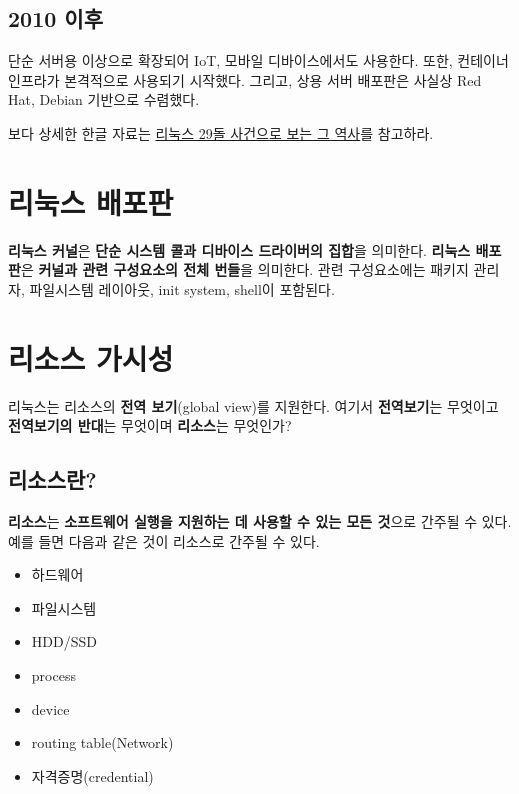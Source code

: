 \subsection*{2010 이후}
단순 서버용 이상으로 확장되어 IoT, 모바일 디바이스에서도 사용한다.\newline
또한, 컨테이너 인프라가 본격적으로 사용되기 시작했다.\newline
그리고, 상용 서버 배포판은 사실상 Red Hat, Debian 기반으로 수렴했다.

\begin{flushleft}
    보다 상세한 한글 자료는 \href{https://zdnet.co.kr/view/?no=20200826135027}{리눅스 29돌 사건으로 보는 그 역사}를 참고하라.    
\end{flushleft}



\section{리눅스 배포판}
\textbf{리눅스 커널}은 \textbf{단순 시스템 콜과 디바이스 드라이버의 집합}을 의미한다.\newline
\textbf{리눅스 배포판}은 \textbf{커널과 관련 구성요소의 전체 번들}을 의미한다. 
관련 구성요소에는 패키지 관리자, 파일시스템 레이아웃, init system, shell이 포함된다.
\newpage


\section{리소스 가시성}
리눅스는 리소스의 \textbf{전역 보기}(global view)를 지원한다.\newline
여기서 \textbf{전역보기}는 무엇이고 \textbf{전역보기의 반대}는 무엇이며 \textbf{리소스}는 무엇인가?

\subsection*{리소스란?}
\textbf{리소스}는 \textbf{소프트웨어 실행을 지원하는 데 사용할 수 있는 모든 것}으로 간주될 수 있다.\newline
예를 들면 다음과 같은 것이 리소스로 간주될 수 있다.

\begin{itemize}
    \item 하드웨어
    \item 파일시스템
    \item HDD/SSD
    \item process
    \item device
    \item routing table(Network)
    \item 자격증명(credential)
\end{itemize}

